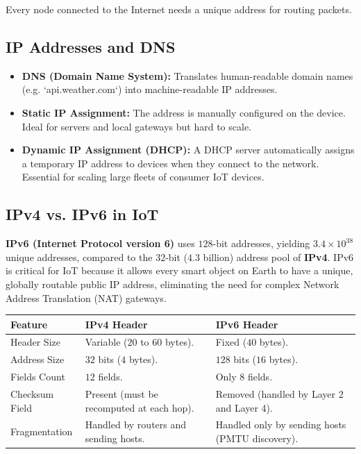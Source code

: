 \documentclass[12pt,a4paper]{article}
\renewcommand{\arraystretch}{1.45}
\begin{document}
Every node connected to the Internet needs a unique address for routing packets.

\subsection{IP Addresses and DNS}
\begin{itemize}[leftmargin=*, itemsep=3pt]
  \item \textbf{DNS (Domain Name System):} Translates human-readable domain names (e.g. `api.weather.com`) into machine-readable IP addresses.
  \item \textbf{Static IP Assignment:} The address is manually configured on the device. Ideal for servers and local gateways but hard to scale.
  \item \textbf{Dynamic IP Assignment (DHCP):} A DHCP server automatically assigns a temporary IP address to devices when they connect to the network. Essential for scaling large fleets of consumer IoT devices.
\end{itemize}

\subsection{IPv4 vs. IPv6 in IoT}
\begin{tcolorbox}[defbox, title={IPv6 Importance in IoT}]
  \textbf{IPv6 (Internet Protocol version 6)} uses $128$-bit addresses, yielding $3.4 \times 10^{38}$ unique addresses, compared to the $32$-bit ($4.3$ billion) address pool of \textbf{IPv4}. IPv6 is critical for IoT because it allows every smart object on Earth to have a unique, globally routable public IP address, eliminating the need for complex Network Address Translation (NAT) gateways.
\end{tcolorbox}

\par\vspace{6pt}\noindent
{\renewcommand{\arraystretch}{1.3}%
\begin{tabularx}{\linewidth}{|B{3.0cm}|Y|Y|}
\hline
\textbf{Feature} & \textbf{IPv4 Header} & \textbf{IPv6 Header} \\
\hline
Header Size & Variable ($20$ to $60$ bytes). & Fixed ($40$ bytes). \\
\hline
Address Size & $32$ bits ($4$ bytes). & $128$ bits ($16$ bytes). \\
\hline
Fields Count & $12$ fields. & Only $8$ fields. \\
\hline
Checksum Field & Present (must be recomputed at each hop). & Removed (handled by Layer 2 and Layer 4). \\
\hline
Fragmentation & Handled by routers and sending hosts. & Handled only by sending hosts (PMTU discovery). \\
\hline
\end{tabularx}}
\end{document}
